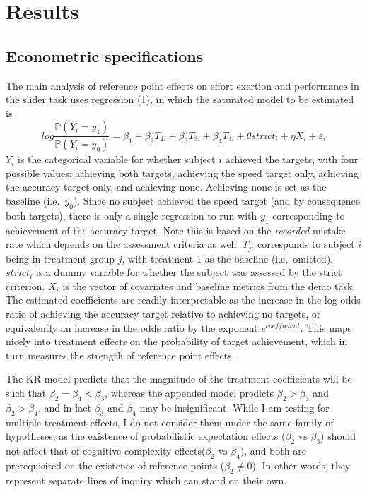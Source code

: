 \documentclass[12pt, letterpaper]{article}
\begin{document}
\section{Results}

\subsection{Econometric specifications}

The main analysis of reference point effects on effort exertion and performance in the slider task uses regression (1), in which the saturated model to be estimated is
\[
log \frac {\mathbb{P}(Y_i = y_1)}{\mathbb{P}(Y_i = y_0)} = \beta_{1} + \beta_2 T_{2i} +\beta_3 T_{3i} +\beta_4 T_{4i} + \theta strict_i + \eta X_i + \varepsilon_i \tag{1}
\]
$Y_i$ is the categorical variable for whether subject $i$ achieved the targets, with four possible values: achieving both targets, achieving the speed target only, achieving the accuracy target only, and achieving none. Achieving none is set as the baseline (i.e.~$y_0$). Since no subject achieved the speed target (and by consequence both targets), there is only a single regression to run with $y_1$ corresponding to achievement of the accuracy target. Note this is based on the \emph{recorded} mistake rate which depends on the assessment criteria as well. $T_{ji}$ corresponds to subject $i$ being in treatment group $j$, with treatment 1 as the baseline (i.e.~omitted). $strict_i$ is a dummy variable for whether the subject was assessed by the strict criterion. $X_i$ is the vector of covariates and baseline metrics from the demo task. The estimated coefficients are readily interpretable as the increase in the log odds ratio of achieving the accuracy target relative to achieving no targets, or equivalently an increase in the odds ratio by the exponent $e^{coefficient}$. This maps nicely into treatment effects on the probability of target achievement, which in turn measures the strength of reference point effects.

The KR model predicts that the magnitude of the treatment coefficients will be such that $\beta_2 = \beta_4 < \beta_3$, whereas the appended model predicts $\beta_2 > \beta_3$ and $\beta_2 > \beta_4$, and in fact $\beta_3$ and $\beta_4$ may be insignificant. While I am testing for multiple treatment effects, I do not consider them under the same family of hypotheses, as the existence of probabilistic expectation effects ($\beta_2 \text{ vs } \beta_3$) should not affect that of cognitive complexity effects($\beta_2 \text{ vs } \beta_4$), and both are prerequisited on the existence of reference points ($\beta_2 \neq 0$). In other words, they represent separate lines of inquiry which can stand on their own.
\end{document}
